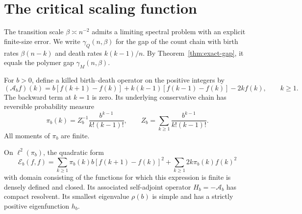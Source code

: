 \section{The critical scaling function}
\label{sec:critical-scaling}

The transition scale $\beta\asymp n^{-2}$ admits a limiting spectral
problem with an explicit finite-size error.  We write $\gamma_Q(n,\beta)$
for the gap of the count chain with birth rates $\beta(n-k)$ and death
rates $k(k-1)/n$.  By Theorem~\ref{thm:exact-gap}, it equals the polymer
gap $\gamma_M(n,\beta)$.

For $b>0$, define a killed birth--death operator on the positive integers
by
\begin{equation}\label{eq:critical-infinite-operator}
 (\mathcal A_b f)(k)
 =b[f(k+1)-f(k)]+k(k-1)[f(k-1)-f(k)]-2kf(k),
 \qquad k\geq1.
\end{equation}
The backward term at $k=1$ is zero.  Its underlying conservative chain
has reversible probability measure
\begin{equation}\label{eq:critical-weight}
 \pi_b(k)=Z_b^{-1}\frac{b^{k-1}}{k!(k-1)!},
 \qquad
 Z_b=\sum_{k\geq1}\frac{b^{k-1}}{k!(k-1)!}.
\end{equation}
All moments of $\pi_b$ are finite.

\begin{proposition}
\label{prop:critical-operator}
On $\ell^2(\pi_b)$, the quadratic form
\begin{equation}\label{eq:critical-form}
 \mathcal E_b(f,f)
 =\sum_{k\geq1}\pi_b(k)b[f(k+1)-f(k)]^2
   +\sum_{k\geq1}2k\pi_b(k)f(k)^2
\end{equation}
with domain consisting of the functions for which this expression is
finite is densely defined and closed.  Its associated self-adjoint
operator $H_b=-\mathcal A_b$ has compact resolvent.  Its smallest
eigenvalue $\rho(b)$ is simple and has a strictly positive eigenfunction
$h_b$.
\end{proposition}

